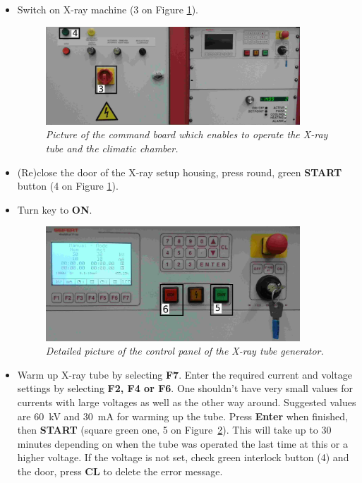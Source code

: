 \documentclass[a4paper,12pt,twoside]{article}
\begin{document}
\begin{itemize}
\item {Switch on X-ray machine (3 on Figure \ref{Commandboard}).
\begin{figure} [h!] \centering 
\includegraphics[width=0.9\textwidth, angle=0] {./Figures/Full2.jpg}
\caption{\em  \label{Commandboard}
Picture of the command board which enables to operate the X-ray tube and the climatic chamber.}
\end{figure}
}
\item {(Re)close the door of the X-ray setup housing, press round, green \textbf{START} button (4 on Figure \ref{Commandboard}).}
\item {Turn key to \textbf{ON}.
\begin{figure} [h!] \centering 
\includegraphics[width=0.9\textwidth, angle=0] {./Figures/CommandBoard2.jpg}
\caption{\em  \label{Xray}
Detailed picture of the control panel of the X-ray tube generator.}
\end{figure}
}
\item{Warm up X-ray tube by selecting \textbf{F7}. Enter the required current and voltage settings by selecting \textbf{F2, F4 or F6}. One shouldn't have very small values for currents with large voltages as well as the other way around. Suggested values are \SI{60}{\kV} and \SI{30}{\mA} for warming up the tube. Press \textbf{Enter} when finished, then \textbf{START} (square green one, 5 on Figure~\ref{Xray}). This will take up to 30 minutes depending on when the tube was operated the last time at this or a higher voltage. If the voltage is not set, check green interlock button (4) and the door, press \textbf{CL} to delete the error message.}

\end{itemize}
\end{document}
